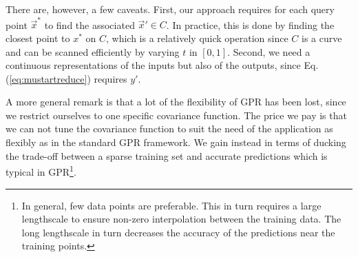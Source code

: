 \documentclass[]{article}
\begin{document}
There are, however, a few caveats. First, our approach requires for each query point $\vec x^*$ to find the associated $\vec x' \in C$. In practice, this is done by finding the closest point to $x^*$ on $C$, which is a relatively quick operation since $C$ is a curve and can be scanned efficiently by varying $t$ in $[0,1]$. Second, we need a continuous representations of the inputs but also of the outputs, since Eq. (\ref{eq:mustartreduce}) requires $y'$. 

A more general remark is that a lot of the flexibility of GPR has been lost, since we restrict ourselves to one specific covariance function. The price we pay is that we can not tune the covariance function to suit the need of the application as flexibly as in the standard GPR framework. We gain instead in terms of ducking the trade-off between a sparse training set and accurate predictions which is typical in GPR\footnote{In general, few data points are preferable. This in turn requires a large lengthscale to ensure non-zero interpolation between the training data. The long lengthscale in turn decreases the accuracy of the predictions near the training points.}. 
\end{document}

